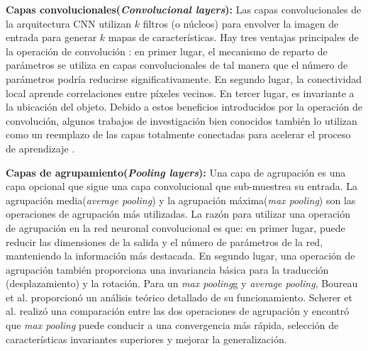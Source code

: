 \textbf{Capas convolucionales(\textit{Convolucional layers}):} Las capas convolucionales de la arquitectura CNN utilizan $k$ filtros (o núcleos) para envolver la imagen de entrada para generar $k$ mapas de características. Hay tres ventajas principales de la operación de convolución \cite{Zeiler}: en primer lugar, el mecanismo de reparto de parámetros se utiliza en capas convolucionales de tal manera que el número de parámetros podría reducirse significativamente. En segundo lugar, la conectividad local aprende correlaciones entre píxeles vecinos. En tercer lugar, es invariante a la ubicación del objeto. Debido a estos beneficios introducidos por la operación de convolución, algunos trabajos de investigación bien conocidos también lo utilizan como un reemplazo de las capas totalmente conectadas para acelerar el proceso de aprendizaje \cite{Szegedy,Oquab}.

\textbf{Capas de agrupamiento(\textit{Pooling layers}):} Una capa de agrupación es una capa opcional que sigue una capa convolucional que sub-muestrea su entrada. La agrupación media(\textit{average pooling}) y la agrupación máxima(\textit{max pooling}) son las operaciones de agrupación más utilizadas. La razón para utilizar una operación de agrupación en la red neuronal convolucional es que: en primer lugar, puede reducir las dimensiones de la salida y el número de parámetros de la red, manteniendo la información más destacada. En segundo lugar, una operación de agrupación también proporciona una invariancia básica para la traducción (desplazamiento) y la rotación.  Para un \textit{max pooling}g y \textit{average pooling}, Boureau et al. \cite{Boureau} proporcionó un análisis teórico detallado de su funcionamiento. Scherer et al. \cite{Scherer} realizó una comparación entre las dos operaciones de agrupación y encontró que \textit{max pooling} puede conducir a una convergencia más rápida, selección de características invariantes superiores y mejorar la generalización.

